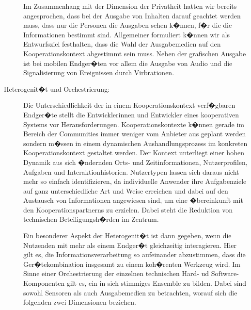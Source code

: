 \begin{description}
Im Zusammenhang mit der Dimension der Privatheit hatten wir bereits angesprochen, dass bei der Ausgabe von Inhalten darauf geachtet werden muss, dass nur die  Personen die Ausgaben sehen k�nnen, f�r die die Informationen bestimmt sind. Allgemeiner formuliert k�nnen wir als Entwurfsziel festhalten, dass die Wahl der Ausgabemedien auf den Kooperationskontext abgestimmt sein muss. Neben der grafischen Ausgabe ist bei mobilen Endger�ten vor allem die Ausgabe von Audio und die Signalisierung von Ereignissen durch Virbrationen.



\item[Heterogenit�t und Orchestrierung:] Die Unterschiedlichkeit der in einem Kooperationskontext verf�gbaren Endger�te stellt die Entwicklerinnen und Entwickler eines kooperativen Systems vor Herausforderungen. Kooperationskontexte k�nnen gerade im Bereich der Communities immer weniger vom Anbieter aus geplant werden sondern m�ssen in einem dynamischen Aushandlungsprozess im konkreten Kooperationskontext gestaltet werden. Der Kontext unterliegt einer hohen Dynamik aus sich �ndernden Orts- und Zeitinformationen, Nutzerprofilen, Aufgaben und Interaktionhistorien. Nutzertypen lassen sich daraus nicht mehr so einfach identifizieren, da individuelle Anwender ihre Aufgabenziele auf ganz unterschiedliche Art und Weise erreichen und dabei auf den Austausch von Informationen angewiesen sind, um eine �bereinkunft mit den Kooperationspartnerns zu erzielen.  
\citet[385]{Rahwan2005}
Dabei steht die Reduktion von technischen Beteiligungsh�rden im Zentrum. 

Ein besonderer Aspekt der Heterogenit�t ist dann gegeben, wenn die Nutzenden mit mehr als einem Endger�t gleichzeitig interagieren. Hier gilt es, die Informationsverarbeitung so aufeinander abzustimmen, dass die Ger�tekombination insgesamt zu einem koh�renten Werkzeug wird. Im Sinne einer Orchestrierung der einzelnen technischen Hard- ud Software-Komponenten gilt es, ein in sich stimmiges Ensemble zu bilden. Dabei sind sowohl Sensoren als auch Ausgabemedien zu betrachten, worauf sich die folgenden zwei Dimensionen beziehen.



\end{description}
